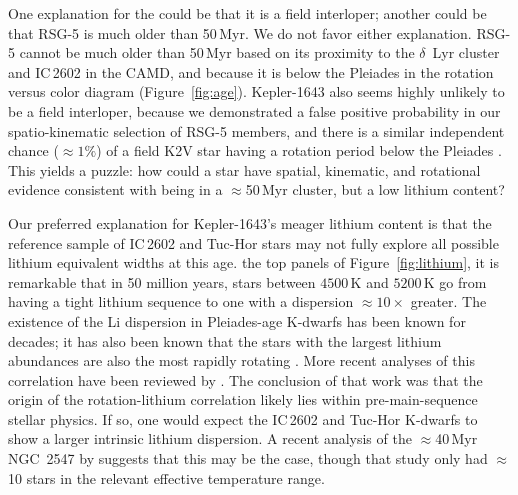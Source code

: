 \documentclass[12pt,twocolumn,tighten,linenumbers]{aastex63}
\begin{document}
One explanation for the  could be that it is a field
interloper; another could be that RSG-5 is much older than 50\,Myr.  We do
not favor either explanation.  
RSG-5 cannot be much older than 50\,Myr
based on its proximity to the $\delta$~Lyr cluster and IC\,2602 in the
CAMD, and because it is below the Pleiades in the 
rotation versus color diagram (Figure~\ref{fig:age}).
Kepler-1643 also seems highly unlikely to be a field interloper, 
because we demonstrated a  false positive probability
in our spatio-kinematic selection of RSG-5 members, and there is a 
similar independent chance
($\approx$$1\%$) of a field K2V star having a rotation period below the
Pleiades \citep{mcquillan_rotation_2014}.
This yields a puzzle: how could a star have spatial, kinematic, and rotational
evidence consistent with being in a $\approx$50\,Myr cluster,
but a low lithium content?

Our preferred explanation for Kepler-1643's meager lithium 
content is that the reference sample of IC\,2602 and Tuc-Hor
stars may not fully explore all possible lithium equivalent widths at this age.
the top panels of Figure~\ref{fig:lithium}, it is  remarkable that in
50 million years, stars between $4500$\,K and $5200$\,K go from
having a tight lithium sequence to one with a dispersion
$\approx$$10\times$ greater.  The existence of the Li dispersion in
Pleiades-age K-dwarfs has been known for decades; it has also been
known that the stars with the largest lithium abundances are also the
most rapidly rotating
\citep{butler_pleiades_1987,soderblom_evolution_1993}.  More recent
analyses of this correlation have been reviewed by
\citet{bouvier_lithium-rotation_2020}.  The conclusion of that work
was that the origin of the rotation-lithium correlation likely lies
within pre-main-sequence stellar physics.  If so, one would expect the
IC\,2602 and Tuc-Hor K-dwarfs to show a larger intrinsic lithium
dispersion.  A recent analysis of the $\approx$40\,Myr
NGC~2547 by \citet{binks_2022} suggests that this may
be the case, though that study only had $\approx$10 stars in the relevant
effective temperature range.
\end{document}

